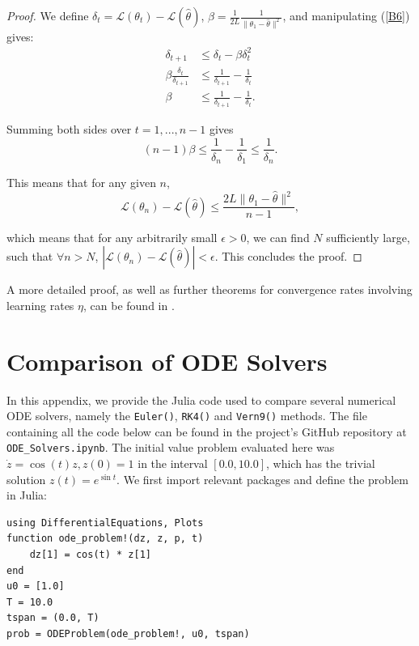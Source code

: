 \documentclass[a4paper,11pt,titlepage]{article}
\theoremstyle{definition}
\theoremstyle{plain}
\theoremstyle{remark}
\begin{document}
\begin{proof}
    We define $\delta_t = \mathcal{L}(\theta_{t}) - \mathcal{L}(\hat{\theta})$, $\beta = \frac{1}{2L} \frac{1}{\| \theta_1 - \hat{\theta} \|^2}$, and manipulating (\ref{B6}) gives:
    \begin{align*}
        \delta_{t+1} &\leq \delta_t - \beta \delta_t^2 \\
        \beta \frac{\delta_t}{\delta_{t+1}} &\leq \frac{1}{\delta_{t+1}} - \frac{1}{\delta_{t}} \\
        \beta &\leq \frac{1}{\delta_{t+1}} - \frac{1}{\delta_{t}}.
    \end{align*}
    
    Summing both sides over $t = 1, ..., n - 1$ gives 
    $$
    (n-1)\beta \leq \frac{1}{\delta_n} - \frac{1}{\delta_1} \leq \frac{1}{\delta_n}.
    $$
    
    This means that for any given $n$,
    \begin{equation}
        \mathcal{L}(\theta_n) - \mathcal{L}(\hat{\theta}) \leq \frac{2L\|\theta_1 - \hat{\theta}\|^2}{n-1},
    \end{equation}
    
    which means that for any arbitrarily small $\epsilon > 0$, we can find $N$ sufficiently large, such that $\forall n > N$, $|\mathcal{L}(\theta_n) - \mathcal{L}(\hat{\theta})| < \epsilon$. This concludes the proof.
\end{proof}

A more detailed proof, as well as further theorems for convergence rates involving learning rates $\eta$, can be found in \cite{gower2015}.

\pagebreak
\section{Comparison of ODE Solvers}
\label{sec:odesolvecode}

In this appendix, we provide the Julia code used to compare several numerical ODE solvers, namely the \texttt{Euler()}, \texttt{RK4()} and \texttt{Vern9()} methods. The file containing all the code below can be found in the project's GitHub repository at \verb|ODE_Solvers.ipynb|. The initial value problem evaluated here was $\dot{z} = \cos(t)z, z(0) = 1$ in the interval $[0.0, 10.0]$, which has the trivial solution $z(t) = e^{\sin t}$. We first import relevant packages and define the problem in Julia:
\begin{verbatim}
using DifferentialEquations, Plots
function ode_problem!(dz, z, p, t)
    dz[1] = cos(t) * z[1]
end
u0 = [1.0]
T = 10.0
tspan = (0.0, T)
prob = ODEProblem(ode_problem!, u0, tspan)
\end{verbatim}
\end{document}
